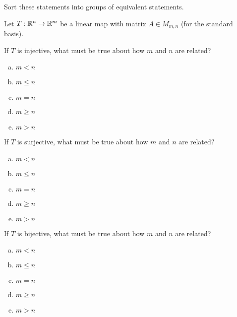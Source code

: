\begin{applicationActivities}{2}{22}
\begin{activity}{15}
Sort these statements into groups of equivalent statements.

\end{activity}

\begin{activity}{5}
Let $T: \mathbb{R}^n \rightarrow \mathbb{R}^m$ be a linear map with matrix $A \in M_{m,n}$ (for the standard basis).

If $T$ is injective, what must be true about how $m$ and $n$ are related?
\begin{enumerate}[(a)]
\item $m<n$
\item $m \leq n$
\item $m=n$
\item $m \geq n$
\item $m>n$
\end{enumerate}
\end{activity}

\begin{activity}{5}
If $T$ is surjective, what must be true about how $m$ and $n$ are related?
\begin{enumerate}[(a)]
\item $m<n$
\item $m \leq n$
\item $m=n$
\item $m \geq n$
\item $m>n$
\end{enumerate}
\end{activity}

\begin{activity}{5}
  If $T$ is bijective, what must be true about how $m$ and $n$ are related?
\begin{enumerate}[(a)]
\item $m<n$
\item $m \leq n$
\item $m=n$
\item $m \geq n$
\item $m>n$
\end{enumerate}
\end{activity}

\end{applicationActivities}
